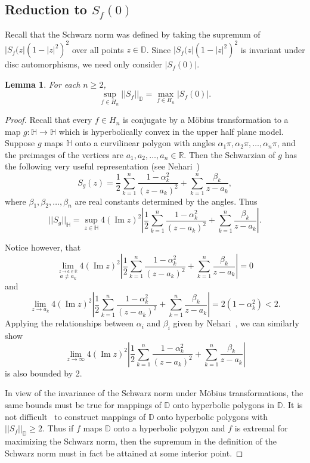 \documentclass{lms}
\newcommand{\D}{\mathbb D}
\newcommand{\R}{\mathbb R}
\newcommand{\HH}{\mathbb H}
\newcommand{\abs}[1]{\lvert#1\rvert}
\newcommand{\norm}[1]{\lvert\lvert#1\rvert\rvert}
\newtheorem{lemma}[theorem]{Lemma}
\DeclareMathOperator{\im}{Im}
\numberwithin{equation}{section}
\begin{document}
\subsection{Reduction to $S_f(0)$}

Recall that the Schwarz norm was defined by taking the supremum 
of $\abs{S_f(z}\left(1-\abs{z}^2\right)^2$
over all points $z\in\D$.  Since 
$\abs{S_f(z}\left(1-\abs{z}^2\right)^2$ is invariant under disc automorphisms,
we need only consider $\abs{S_f(0)}$.

\begin{lemma}\label{L:sf0}
For each $n\geq 2$,
\[
\sup_{f\in H_n} \norm{S_f}_\D = \max_{f\in H_n} \abs{S_f(0)}.
\] 
\end{lemma}

\begin{proof}
Recall that every $f\in H_n$ is conjugate by a M\"obius transformation to
a map $g:\HH\to\HH$ which is hyperbolically convex in the upper half plane
model.  
Suppose  $g$ maps $\HH$ onto a curvilinear polygon with angles
$\alpha_1\pi,\alpha_2\pi,\dots, \alpha_n\pi$,  and the preimages of the
vertices are $a_1,a_2,\dots,a_n\in\R$. 
Then the Schwarzian of $g$ has the following very useful representation
(see Nehari~\cite{zN52})
\begin{equation}
S_g(z) = \frac{1}{2}\sum_{k=1}^n \frac{1-\alpha_k^2}{(z-a_k)^2} 
+\sum_{k=1}^n\frac{\beta_k}{z-a_k},
\end{equation}
where $\beta_1,\beta_2,\dots,\beta_n$ are real constants determined by
the angles.
Thus
\[
\norm{S_g}_\HH = \sup_{z\in\HH} 4(\im z)^2 
\left|\frac{1}{2}\sum_{k=1}^n \frac{1-\alpha_k^2}{(z-a_k)^2} 
+\sum_{k=1}^n\frac{\beta_k}{z-a_k}\right|.
\]

Notice however, that
\[
\lim_{\overset{z\to a\in \R}{a\neq a_k}} 4(\im z)^2 
\left|\frac{1}{2}\sum_{k=1}^n \frac{1-\alpha_k^2}{(z-a_k)^2} 
+\sum_{k=1}^n\frac{\beta_k}{z-a_k}\right| = 0
\]
and 
\[
\lim_{z\to a_k} 4(\im z)^2 
\left|\frac{1}{2}\sum_{k=1}^n \frac{1-\alpha_k^2}{(z-a_k)^2} 
+\sum_{k=1}^n\frac{\beta_k}{z-a_k}\right|
= 2(1-\alpha_k^2)<2.
\]
Applying the relationships between $\alpha_i$ and 
$\beta_i$ given by Nehari~\cite{zN52}, we can similarly
show 
\[
\lim_{z\to \infty} 4(\im z)^2 
\left|\frac{1}{2}\sum_{k=1}^n \frac{1-\alpha_k^2}{(z-a_k)^2} 
+\sum_{k=1}^n\frac{\beta_k}{z-a_k}\right|
\]
is also bounded by 2.

In view of the invariance of the Schwarz norm under
M\"obius transformations, the same bounds must be true for mappings of $\D$
onto hyperbolic polygons in $\D$. 
It is not difficult~\cite{PM00} to construct mappings of $\D$ onto 
hyperbolic polygons with $\norm{S_f}_\D \geq 2$.  Thus if 
$f$ maps $\D$ onto a hyperbolic polygon and $f$ is extremal for
maximizing the Schwarz norm, then the
supremum  in the definition of the Schwarz norm must in fact be attained at some
interior point.  
 

\end{proof}
\end{document}
